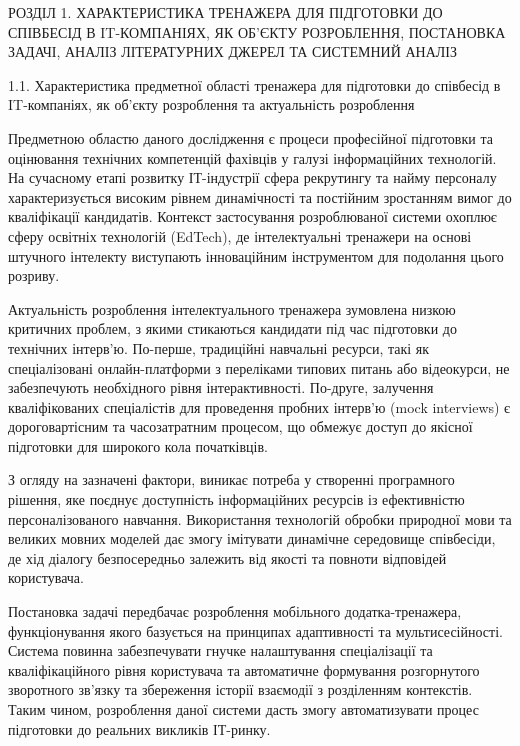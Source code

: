 \protect{}\label{_heading=h.5iej67xrqf5j}{}РОЗДІЛ 1.
ХАРАКТЕРИСТИКА ТРЕНАЖЕРА ДЛЯ ПІДГОТОВКИ ДО СПІВБЕСІД В IT-КОМПАНІЯХ, ЯК
ОБ'ЄКТУ РОЗРОБЛЕННЯ, ПОСТАНОВКА ЗАДАЧІ, АНАЛІЗ ЛІТЕРАТУРНИХ ДЖЕРЕЛ ТА
СИСТЕМНИЙ АНАЛІЗ

\protect{}\label{_heading=h.de52ojbplqdx}{}1.1.
Характеристика предметної області тренажера для підготовки до співбесід
в IT-компаніях, як об'єкту розроблення та актуальність розроблення

Предметною областю даного дослідження є процеси професійної підготовки
та оцінювання технічних компетенцій фахівців у галузі інформаційних
технологій. На сучасному етапі розвитку ІТ-індустрії сфера рекрутингу та
найму персоналу характеризується високим рівнем динамічності та
постійним зростанням вимог до кваліфікації кандидатів. Контекст
застосування розроблюваної системи охоплює сферу освітніх технологій
(EdTech), де інтелектуальні тренажери на основі штучного інтелекту
виступають інноваційним інструментом для подолання цього розриву.

Актуальність розроблення інтелектуального тренажера зумовлена низкою
критичних проблем, з якими стикаються кандидати під час підготовки до
технічних інтерв'ю. По-перше, традиційні навчальні ресурси, такі як
спеціалізовані онлайн-платформи з переліками типових питань або
відеокурси, не забезпечують необхідного рівня інтерактивності. По-друге,
залучення кваліфікованих спеціалістів для проведення пробних інтерв'ю
(mock interviews) є дороговартісним та часозатратним процесом, що
обмежує доступ до якісної підготовки для широкого кола початківців.

З огляду на зазначені фактори, виникає потреба у створенні програмного
рішення, яке поєднує доступність інформаційних ресурсів із ефективністю
персоналізованого навчання. Використання технологій обробки природної
мови та великих мовних моделей дає змогу імітувати динамічне середовище
співбесіди, де хід діалогу безпосередньо залежить від якості та повноти
відповідей користувача.

Постановка задачі передбачає розроблення мобільного додатка-тренажера,
функціонування якого базується на принципах адаптивності та
мультисесійності. Система повинна забезпечувати гнучке налаштування
спеціалізації та кваліфікаційного рівня користувача та автоматичне
формування розгорнутого зворотного зв'язку та збереження історії
взаємодії з розділенням контекстів. Таким чином, розроблення даної
системи дасть змогу автоматизувати процес підготовки до реальних
викликів ІТ-ринку.

